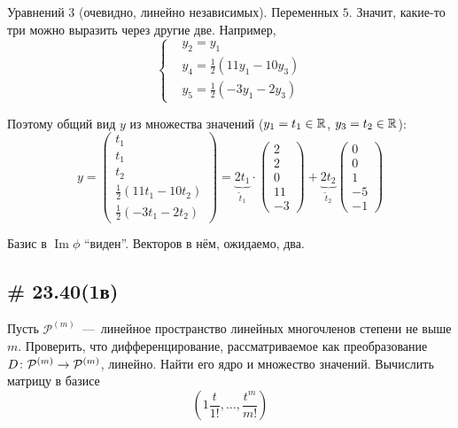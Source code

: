 \documentclass[a4paper,12pt]{article}
\DeclareMathOperator{\Image}{Im}
\begin{document}
\begin{solution}
    Уравнений $3$ (очевидно, линейно независимых).
    Переменных $5$.
    Значит, какие-то три можно выразить через другие две.
    Например,
    \[
      \left\{
        \begin{aligned}
          &y_2 = y_1\\
          &y_4 = \frac{1}{2} (11y_1 - 10y_3)\\
          &y_5 = \frac{1}{2} (-3y_1 - 2y_3)
        \end{aligned}
      \right.
    \]
    
    Поэтому общий вид $y$ из множества значений ($y_1 \hm= t_1 \hm\in \RR$, $y_3 \hm= t_2 \hm\in \RR$):
    \[
      y = \begin{pmatrix}
        t_1 \\ t_1 \\ t_2 \\ \frac{1}{2} (11 t_1 - 10 t_2) \\ \frac{1}{2} (-3 t_1 - 2 t_2)
      \end{pmatrix}
      = \underbrace{2t_1}_{\tilde{t}_1} \cdot \begin{pmatrix}
        2 \\ 2 \\ 0 \\ 11 \\ -3
      \end{pmatrix} + \underbrace{2t_2}_{\tilde{t}_2} \begin{pmatrix}
        0 \\ 0 \\ 1 \\ -5 \\ -1
      \end{pmatrix}
    \]
    
    Базис в $\Image\phi$ ``виден''.
    Векторов в нём, ожидаемо, два.
  \end{solution}
  
  
  \subsection{\# 23.40(1в)}
  
  Пусть $\mathcal P^{(m)}$~---~линейное пространство линейных многочленов степени не выше $m$.
  Проверить, что дифференцирование, рассматриваемое как преобразование $D\colon \mathcal P^{(m)} \hm\to \mathcal P^{(m)}$, линейно.
  Найти его ядро и множество значений.
  Вычислить матрицу в базисе
  \[
    \left(1 \frac{t}{1!}, \ldots, \frac{t^m}{m!}\right)
  \]
  
\end{document}
